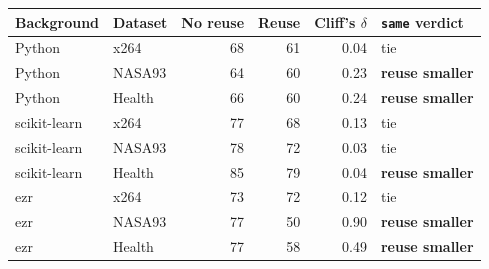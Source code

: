 \begin{tabular}{llrrrl}
\toprule
Background & Dataset & No reuse & Reuse & Cliff's $\delta$ & \texttt{same} verdict \\
\midrule
Python & x264 & 68 & 61 & 0.04 & tie \\
Python & NASA93 & 64 & 60 & 0.23 & \textbf{reuse smaller} \\
Python & Health & 66 & 60 & 0.24 & \textbf{reuse smaller} \\
scikit-learn & x264 & 77 & 68 & 0.13 & tie \\
scikit-learn & NASA93 & 78 & 72 & 0.03 & tie \\
scikit-learn & Health & 85 & 79 & 0.04 & \textbf{reuse smaller} \\
ezr & x264 & 73 & 72 & 0.12 & tie \\
ezr & NASA93 & 77 & 50 & 0.90 & \textbf{reuse smaller} \\
ezr & Health & 77 & 58 & 0.49 & \textbf{reuse smaller} \\
\bottomrule
\end{tabular}